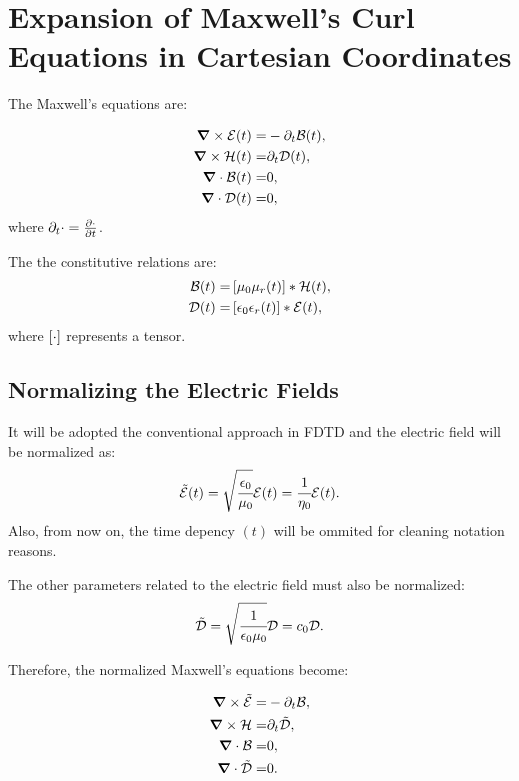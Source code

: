 \section{Expansion of Maxwell's Curl Equations in Cartesian Coordinates}

The Maxwell's equations are:

\begin{eqnarray}
    \bm{\nabla}\times \mathcal{E}(t) = & -\partial _t \mathcal{B}(t), \\
    \bm{\nabla}\times \mathcal{H}(t) = & \partial_t \mathcal{D}(t), \\
    \bm{\nabla}\cdot \mathcal{B}(t) = & 0, \\
    \bm{\nabla}\cdot \mathcal{D}(t) = & 0,
\end{eqnarray}
where $\partial_t\cdot = \frac{\partial \cdot}{\partial t}$.

The the constitutive relations are:
\begin{eqnarray}
    \Bt(t) = & \brackets{\mu_0\mu_r  (t)} \ast \Hht(t), \\
    \Dt(t) = & \brackets{\epsilon_0 \epsilon_r  (t)} \ast \Et(t),
\end{eqnarray}
where $\brackets{\cdot}$ represents a tensor.

\subsection{Normalizing the Electric Fields}
It will be adopted the conventional approach in FDTD and the electric field will be normalized as:
\begin{equation}
    \tilde{\mathcal{E}}(t) = \sqrt{\cfrac{\epsilon_0}{\mu_0}}\mathcal{E}(t) = \cfrac{1}{\eta_0}\mathcal{E}(t).
\end{equation}
Also, from now on, the time depency $(t)$ will be ommited for cleaning notation reasons.

The other parameters related to the electric field must also be normalized:
\begin{equation}
    \tilde{\mathcal{D}} = \sqrt{\cfrac{1}{\epsilon_0\mu_0}} \mathcal{D} = c_0 \mathcal{D}.
\end{equation}

Therefore, the normalized Maxwell's equations become:

\begin{eqnarray}
    \bm{\nabla}\times \tilde{\mathcal{E}} = & -\partial _t \mathcal{B}, \\
    \bm{\nabla}\times \mathcal{H} = & \partial_t \tilde{\mathcal{D}}, \\
    \bm{\nabla}\cdot \mathcal{B} = & 0, \\
    \bm{\nabla}\cdot \tilde{\mathcal{D}} = & 0.
\end{eqnarray}


